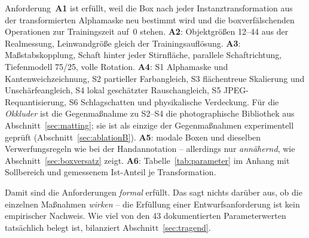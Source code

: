 Anforderung~\textbf{A1} ist erfüllt, weil die Box nach jeder
Instanztransformation aus der transformierten Alphamaske neu bestimmt wird und
die boxverfälschenden Operationen zur Trainingszeit auf~0 stehen.
\textbf{A2}: Objektgrößen 12--44\px{} aus der Realmessung, Leinwandgröße gleich
der Trainingsauflösung. \textbf{A3}: Maßstabskopplung, Schaft hinter jeder
Stirnfläche, parallele Schaftrichtung, Tiefenmodell 75/25, volle Rotation.
\textbf{A4}: S1 Alphamaske und Kantenweichzeichnung, S2 partieller Farbangleich,
S3 flächentreue Skalierung und Unschärfeangleich, S4 lokal geschätzter
Rauschangleich, S5 JPEG-Requantisierung, S6 Schlagschatten und physikalische
Verdeckung. Für die \emph{Okkluder} ist die Gegenmaßnahme zu S2--S4 die
photographische Bibliothek aus Abschnitt~\ref{sec:matting}; sie ist als einzige
der Gegenmaßnahmen experimentell geprüft (Abschnitt~\ref{sec:ablationB}).
\textbf{A5}: modale Boxen und dieselben Verwerfungsregeln wie bei der
Handannotation -- allerdings nur \emph{annähernd}, wie
Abschnitt~\ref{sec:boxversatz} zeigt. \textbf{A6}: Tabelle~\ref{tab:parameter}
im Anhang mit Sollbereich und gemessenem Ist-Anteil je Transformation.

Damit sind die Anforderungen \emph{formal} erfüllt. Das sagt nichts darüber aus,
ob die einzelnen Maßnahmen \emph{wirken} -- die Erfüllung einer
Entwurfsanforderung ist kein empirischer Nachweis. Wie viel von den 43
dokumentierten Parameterwerten tatsächlich belegt ist, bilanziert
Abschnitt~\ref{sec:tragend}.
